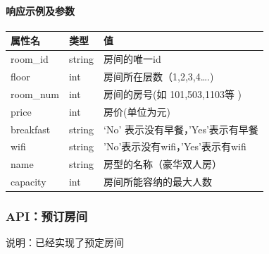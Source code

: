 \documentclass[]{article}
\let\oldparagraph\paragraph
\renewcommand{\paragraph}[1]{\oldparagraph{#1}\mbox{}}
\begin{document}
\hypertarget{ux54cdux5e94ux793aux4f8bux53caux53c2ux6570-1}{%
\paragraph{响应示例及参数}\label{ux54cdux5e94ux793aux4f8bux53caux53c2ux6570-1}}

\begin{Shaded}
\begin{Highlighting}[]
\FunctionTok{\{}
    \FunctionTok{:}\OtherTok{[}
        \FunctionTok{\{}
             \FunctionTok{:} \FunctionTok{,}
             \FunctionTok{:} \FunctionTok{,}
             \FunctionTok{:} \FunctionTok{,}
             \FunctionTok{:} \FunctionTok{,}
             \FunctionTok{:} \FunctionTok{,}
             \FunctionTok{:} \FunctionTok{,}
             \FunctionTok{:} \FunctionTok{,}
             \FunctionTok{:} 
        \FunctionTok{\}}\OtherTok{,}
        \FunctionTok{\{}
        \FunctionTok{\}}
    \OtherTok{]}
\FunctionTok{\}}
\end{Highlighting}
\end{Shaded}

\begin{longtable}[]{@{}lll@{}}
\toprule
属性名 & 类型 & 值\tabularnewline
\midrule
\endhead
room\_id & string & 房间的唯一id\tabularnewline
floor & int & 房间所在层数（1,2,3,4\ldots{}.)\tabularnewline
room\_num & int & 房间的房号(如 101,503,1103等 )\tabularnewline
price & int & 房价(单位为元)\tabularnewline
breakfast & string & `No' 表示没有早餐，'Yes'表示有早餐\tabularnewline
wifi & string & 'No'表示没有wifi，'Yes'表示有wifi\tabularnewline
name & string & 房型的名称（豪华双人房）\tabularnewline
capacity & int & 房间所能容纳的最大人数\tabularnewline
\bottomrule
\end{longtable}

\hypertarget{apiux9884ux8ba2ux623fux95f4}{%
\subsubsection{API：预订房间}\label{apiux9884ux8ba2ux623fux95f4}}

说明：已经实现了预定房间
\end{document}
